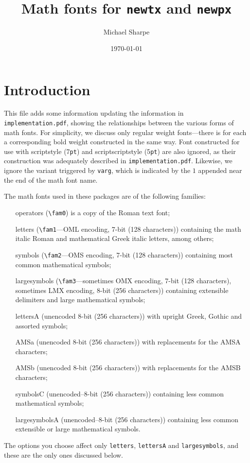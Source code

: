 \documentclass[11pt]{article}
\title{Math fonts for \texttt{newtx} and \texttt{newpx}}
\author{Michael Sharpe}
\date{\today}  %
\begin{document}
\maketitle
\section{Introduction}
This file adds some information updating the information in {\tt implementation.pdf}, showing the relationships between the various forms of math fonts. For simplicity, we discuss only regular weight fonts---there is for each a corresponding bold weight constructed in the same way. Font constructed for use with scriptstyle (7{\tt pt}) and scriptscriptstyle (5{\tt pt}) are also ignored, as their construction was adequately described in {\tt implementation.pdf}. Likewise, we ignore the variant triggered by {\tt varg}, which is indicated by the $1$ appended near the end of the math font name.

The math fonts used in these packages are of the following families:
\begin{itemize}
\item [operators] (\verb|\fam0|) is a copy of the Roman text font;
\item
[letters] (\verb|\fam1|---OML encoding, 7-bit (128 characters)) containing the math italic Roman and mathematical Greek italic letters, among others;
\item [symbols] (\verb|\fam2|---OMS encoding, 7-bit (128 characters)) containing most common mathematical symbols;
\item [largesymbols] (\verb|\fam3|---sometimes OMX encoding, 7-bit (128 characters), sometimes LMX encoding, 8-bit (256 characters)) containing extensible delimiters and large mathematical symbols;
\item [lettersA] (unencoded 8-bit (256 characters)) with upright Greek, Gothic and assorted symbols;
\item [AMSa] (unencoded 8-bit (256 characters)) with replacements for the AMSA characters;
\item [AMSb] (unencoded 8-bit (256 characters)) with replacements for the AMSB characters;
\item [symbolsC] (unencoded--8-bit (256 characters)) containing less common mathematical symbols;
\item [largesymbolsA] (unencoded--8-bit (256 characters)) containing less common extensible or large mathematical symbols.
\end{itemize}
The options you choose affect only {\tt letters}, {\tt lettersA} and {\tt largesymbols}, and these are the only ones discussed below.
\end{document}
